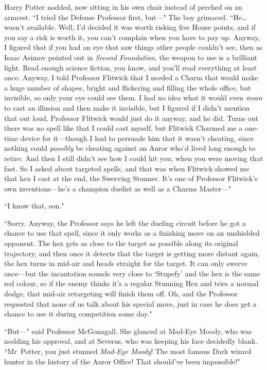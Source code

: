 Harry Potter nodded, now sitting in his own chair instead of perched on an armrest. ``I tried the Defense Professor first, but—" The boy grimaced. ``He{\ldots} wasn't available. Well, I'd decided it was worth risking five House points, and if you say a risk is worth it, you can't complain when you have to pay up. Anyway, I figured that if you had an eye that saw things other people couldn't see, then as Isaac Asimov pointed out in \emph{Second Foundation}, the weapon to use is a brilliant light. Read enough science fiction, you know, and you'll read everything at least once. Anyway, I told Professor Flitwick that I needed a Charm that would make a huge number of shapes, bright and flickering and filling the whole office, but invisible, so only your eye could see them. I had no idea what it would even \emph{mean} to cast an illusion and then make it invisible, but I figured if I didn't mention that out loud, Professor Flitwick would just do it anyway, and he did. Turns out there was no spell like that I could cast myself, but Flitwick Charmed me a one-time device for it—though I had to persuade him that it wasn't cheating, since nothing could \emph{possibly} be cheating against an Auror who'd lived long enough to retire. And then I still didn't see how I could hit you, when you were moving that fast. So I asked about targeted spells, and that was when Flitwick showed me that hex I cast at the end, the Swerving Stunner. It's one of Professor Flitwick's own inventions—he's a champion duelist as well as a Charms Master—"

``I know that, son."

``Sorry. Anyway, the Professor says he left the dueling circuit before he got a chance to use that spell, since it only works as a finishing move on an unshielded opponent. The hex gets as close to the target as possible along its original trajectory, and then once it detects that the target is getting more distant again, the hex turns in mid-air and heads straight for the target. It can only swerve once—but the incantation sounds very close to `Stupefy' and the hex is the same red colour, so if the enemy thinks it's a regular Stunning Hex and tries a normal dodge, that mid-air retargeting will finish them off. Oh, and the Professor requested that none of us talk about his special move, just in case he does get a chance to use it during competition some day."

``But—" said Professor McGonagall. She glanced at Mad-Eye Moody, who was nodding his approval, and at Severus, who was keeping his face decidedly blank. ``Mr~Potter, you just stunned \emph{Mad-Eye Moody}! The most famous Dark wizard hunter in the history of the Auror Office! That should've been impossible!"

